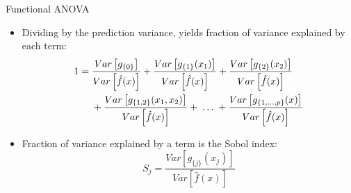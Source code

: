 \documentclass[11pt,compress,t,notes=noshow, aspectratio=169, xcolor=table]{beamer}
\begin{document}
\begin{frame}{Functional ANOVA}

\begin{itemize}
\item Dividing by the prediction variance, yields fraction of variance explained by each term:
\begin{align*}
1 &= \frac{Var\left[g_{\{0\}}\right]}{\predvar} + \frac{Var\left[g_{\{1\}}(x_1)\right]}{\predvar} + \frac{Var\left[g_{\{2\}}(x_2)\right]}{\predvar} \\
&\phantom{{}={}} + \frac{Var\left[g_{\{1, 2\}}(x_1, x_2)\right]}{\predvar} + \;\dots\; + \frac{Var\left[g_{\{1,\ldots,p\}}(x)\right]}{\predvar}
\end{align*}

\item Fraction of variance explained by a term is the Sobol index:
$$
S_j = \frac{Var\left[g_{\{j\}}(x_j)\right]}{Var\left[\hat{f}(x)\right]}
$$
\end{itemize}

\end{frame}


\endlecture
\end{document}
